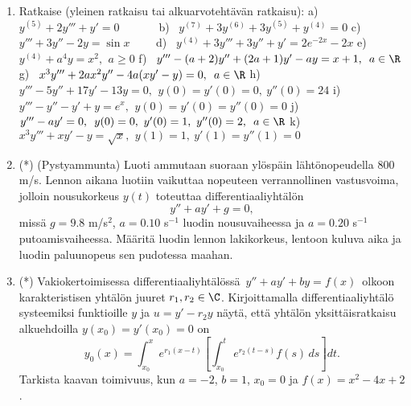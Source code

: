 \begin{enumerate}
\item
Ratkaise (yleinen ratkaisu tai alkuarvotehtävän ratkaisu): \vspace{1mm}\newline
a) \ $y^{(5)}+2y'''+y'=0 \qquad\quad\,$
b) \ $y^{(7)}+3y^{(6)}+3y^{(5)}+y^{(4)}=0$ \newline
c) \ $y'''+3y''-2y=\sin x \qquad$
d) \ $y^{(4)}+3y'''+3y''+y'=2e^{-2x}-2x$ \newline
e) \ $y^{(4)}+a^4y=x^2,\,\ a \ge 0$ \newline
f) \ $y'''-(a+2)y''+(2a+1)y'-ay=x+1,\,\ a\in\R$ \newline
g) \ $x^3y'''+2ax^2y''-4a(xy'-y)=0,\,\ a\in\R$ \newline
h) \ $y'''-5y''+17y'-13y=0,\,\ y(0)=y'(0)=0,\ y''(0)=24$ \newline
i) \ $y'''-y''-y'+y=e^x,\,\ y(0)=y'(0)=y''(0)=0$ \newline
j) \ $y'''-ay'=0,\,\ y(0)=0,\ y'(0)=1,\ y''(0)=2,\,\ a\in\R$ \newline
k) \ $x^3y'''+xy'-y=\sqrt{x},\,\ y(1)=1,\ y'(1)=y''(1)=0$

\item (*) 
(Pystyammunta) Luoti ammutaan suoraan ylöspäin lähtönopeudella $800$ m/s. Lennon aikana
luotiin vaikuttaa nopeuteen verrannollinen vastusvoima, jolloin nousukorkeus $y(t)$ toteuttaa
differentiaaliyhtälön
\[
y''+ay'+g=0, 
\]
missä $g=9.8$ m/s$^2$, $a=0.10$ s$^{-1}$ luodin nousuvaiheessa ja $a=0.20$ s$^{-1}$
putoamisvaiheessa. Määritä luodin lennon lakikorkeus, lentoon kuluva aika ja luodin paluunopeus
sen pudotessa maahan. 

\item (*) \label{H-dy-5: linvak-ty}
Vakiokertoimisessa differentiaaliyhtälössä $\,y''+ay'+by=f(x)\,$ olkoon karakteristisen
yhtälön juuret $r_1,r_2\in\C$. Kirjoittamalla differentiaaliyhtälö systeemiksi funktioille $y$
ja $u=y'-r_2y$ näytä, että yhtälön yksittäisratkaisu alkuehdoilla $y(x_0)=y'(x_0)=0$ on
\[
y_0(x)=\int_{x_0}^x e^{r_1(x-t)}\left[\int_{x_0}^t e^{r_2(t-s)}f(s)\,ds\right]dt.
\]
Tarkista kaavan toimivuus, kun $a=-2$, $b=1$, $x_0=0$ ja $f(x)=x^2-4x+2$.

\end{enumerate}